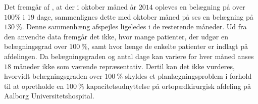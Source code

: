 \noindent
Det fremgår af , at der i oktober måned år $2014$ opleves en belægning på over $100\%$ i 19 dage, sammenlignes dette med oktober måned på  ses en belægning på $130~\%$. Denne sammenhæng afspejles ligeledes i de resterende måneder. 
Ud fra den anvendte data fremgår det ikke, hvor mange patienter, der udgør en belægningsgrad over $100~\%$, samt hvor længe de enkelte patienter er indlagt på afdelingen. 
Da belægningsgraden og antal dage kan variere for hver måned anses $18$ måneder ikke som værende repræsentativ. Dertil kan det ikke vurderes, hvorvidt belægningsgraden over $100~\%$ skyldes et planlægningsproblem i forhold til at opretholde en $100~\%$ kapacitetsudnyttelse på ortopædkirurgisk afdeling på Aalborg Universitetshospital.  
